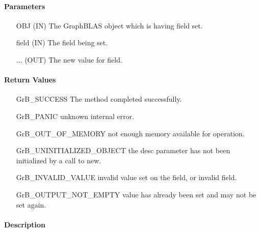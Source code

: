 \paragraph{Parameters}

\begin{itemize}[leftmargin=1.1in]
    \item[{\sf OBJ}] ({\sf IN}) The GraphBLAS object which is having {\sf field} set.
    \item[{\sf field}] ({\sf IN}) The field being set.
    \item[{\sf ...}] ({\sf OUT}) The new value for {\sf field}.
\end{itemize}

\paragraph{Return Values}

\begin{itemize}[leftmargin=2.1in]
    \item[{\sf GrB\_SUCCESS}]  The method completed successfully.
    \item[{\sf GrB\_PANIC}]             unknown internal error.
    \item[{\sf GrB\_OUT\_OF\_MEMORY}]          not enough memory available for operation.
    \item[{\sf GrB\_UNINITIALIZED\_OBJECT}]          the {\sf desc} parameter has not been
                                        initialized by a call to {\sf new}.
    \item[{\sf GrB\_INVALID\_VALUE}]    invalid value set on the field, or invalid field.
    \item[{\sf GrB\_OUTPUT\_NOT\_EMPTY}]    value has already been set and may not be set again.
    \end{itemize}

\paragraph{Description}